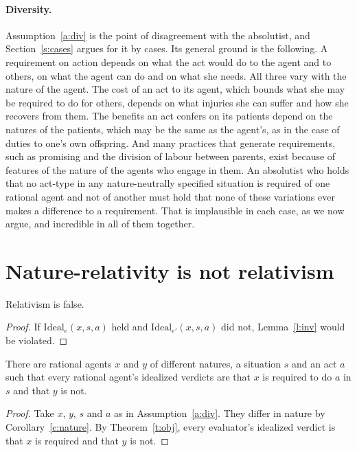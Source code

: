\documentclass{situationist-preprint}
\begin{document}
\paragraph{Diversity.} Assumption~\ref{a:div} is the point of disagreement with the absolutist, and Section~\ref{s:cases} argues for it by cases. Its general ground is the following. A requirement on action depends on what the act would do to the agent and to others, on what the agent can do and on what she needs. All three vary with the nature of the agent. The cost of an act to its agent, which bounds what she may be required to do for others, depends on what injuries she can suffer and how she recovers from them. The benefits an act confers on its patients depend on the natures of the patients, which may be the same as the agent's, as in the case of duties to one's own offspring. And many practices that generate requirements, such as promising and the division of labour between parents, exist because of features of the nature of the agents who engage in them. An absolutist who holds that no act-type in any nature-neutrally specified situation is required of one rational agent and not of another must hold that none of these variations ever makes a difference to a requirement. That is implausible in each case, as we now argue, and incredible in all of them together.

\section{Nature-relativity is not relativism}\label{s:notrel}

\begin{proposition}\label{p:notrel}
Relativism is false.
\end{proposition}

\begin{proof}
If $\mathrm{Ideal}_e(x,s,a)$ held and $\mathrm{Ideal}_{e'}(x,s,a)$ did not, Lemma~\ref{l:inv} would be violated.
\end{proof}

\begin{proposition}\label{p:nodis}
There are rational agents $x$ and $y$ of different natures, a situation $s$ and an act $a$ such that every rational agent's idealized verdicts are that $x$ is required to do $a$ in $s$ and that $y$ is not.
\end{proposition}

\begin{proof}
Take $x$, $y$, $s$ and $a$ as in Assumption~\ref{a:div}. They differ in nature by Corollary~\ref{c:nature}. By Theorem~\ref{t:obj}, every evaluator's idealized verdict is that $x$ is required and that $y$ is not.
\end{proof}
\end{document}

